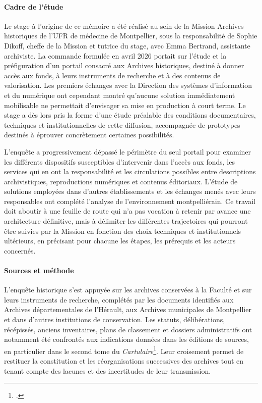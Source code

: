 \paragraph{Cadre de l'étude}

Le stage à l'origine de ce mémoire a été réalisé au sein de la Mission Archives historiques de l'UFR de médecine de Montpellier, sous la responsabilité de Sophie Dikoff, cheffe de la Mission et tutrice du stage, avec Emma Bertrand, assistante archiviste. La commande formulée en avril 2026 portait sur l'étude et la préfiguration d'un portail consacré aux Archives historiques, destiné à donner accès aux fonds, à leurs instruments de recherche et à des contenus de valorisation. Les premiers échanges avec la Direction des systèmes d'information et du numérique ont cependant montré qu'aucune solution immédiatement mobilisable ne permettait d'envisager sa mise en production à court terme. Le stage a dès lors pris la forme d'une étude préalable des conditions documentaires, techniques et institutionnelles de cette diffusion, accompagnée de prototypes destinés à éprouver concrètement certaines possibilités.

L'enquête a progressivement dépassé le périmètre du seul portail pour examiner les différents dispositifs susceptibles d'intervenir dans l'accès aux fonds, les services qui en ont la responsabilité et les circulations possibles entre descriptions archivistiques, reproductions numériques et contenus éditoriaux. L'étude de solutions employées dans d'autres établissements et les échanges menés avec leurs responsables ont complété l'analyse de l'environnement montpelliérain. Ce travail doit aboutir à une feuille de route qui n'a pas vocation à retenir par avance une architecture définitive, mais à délimiter les différentes trajectoires qui pourront être suivies par la Mission en fonction des choix techniques et institutionnels ultérieurs, en précisant pour chacune les étapes, les prérequis et les acteurs concernés.

\paragraph{Sources et méthode}

L'enquête historique s'est appuyée sur les archives conservées à la Faculté et sur leurs instruments de recherche, complétés par les documents identifiés aux Archives départementales de l'Hérault, aux Archives municipales de Montpellier et dans d'autres institutions de conservation. Les statuts, délibérations, récépissés, anciens inventaires, plans de classement et dossiers administratifs ont notamment été confrontés aux indications données dans les éditions de sources, en particulier dans le second tome du \emph{Cartulaire}\footcite{CalmetteCartulaire1912}. Leur croisement permet de restituer la constitution et les réorganisations successives des archives tout en tenant compte des lacunes et des incertitudes de leur transmission.

